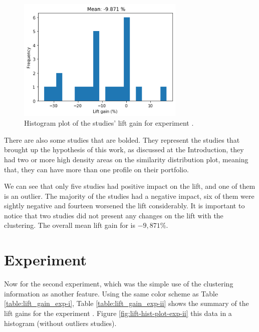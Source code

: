 \begin{figure}[!ht]
   \centering
   \includegraphics[width=8cm]{fig/ch4-lift-hist-plot-exp-i.png}
   \caption{Histogram plot of the studies' lift gain for experiment \nameExperimentI{}.}
   \label{fig:lift-hist-plot-exp-i}
\end{figure}

There are also some studies that are bolded. They represent the studies that brought up the hypothesis of this work, as discussed at the Introduction, they had two or more high density areas on the similarity distribution plot, meaning that, they can have more than one profile on their portfolio.

We can see that only five studies had positive impact on the lift, and one of them is an outlier. The majority of the studies had a negative impact, six of them were sightly negative and fourteen worsened the lift considerably. It is important to notice that two studies did not present any changes on the lift with the clustering. The overall mean lift gain for \nameExperimentI{} is $-9,871 \%$.


\section{Experiment \fullNameExperimentII{}}

Now for the second experiment, which was the simple use of the clustering information as another feature. Using the same color scheme as Table \ref{table:lift_gain_exp-i}, Table \ref{table:lift_gain_exp-ii} shows the summary of the lift gains for the experiment \nameExperimentII{}. Figure \ref{fig:lift-hist-plot-exp-ii} this data in a histogram (without outliers studies).

